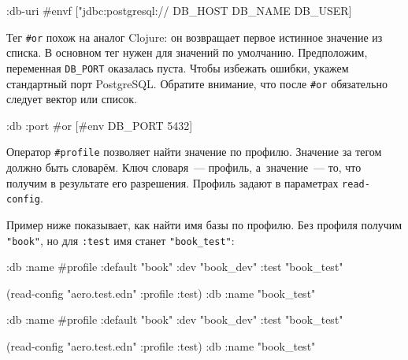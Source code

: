 \else

\begin{english}
  \begin{clojure}
{:db-uri #envf ["jdbc:postgresql://%
                DB_HOST DB_NAME DB_USER]}
  \end{clojure}
\end{english}

\fi

Тег \verb|#or| похож на аналог Clojure: он возвращает первое истинное значение
из списка. В основном тег нужен для значений по умолчанию. Предположим,
переменная \verb|DB_PORT| оказалась пуста. Чтобы избежать ошибки, укажем
стандартный порт PostgreSQL. Обратите внимание, что после \verb|#or| обязательно
следует вектор или список.

\begin{english}
  \begin{clojure}
{:db {:port #or [#env DB_PORT 5432]}}
  \end{clojure}
\end{english}


Оператор \verb|#profile| позволяет найти значение по профилю. Значение за тегом
должно быть словарём. Ключ словаря~--- профиль, а~значение~--- то, что получим в
результате его разрешения. Профиль задают в параметрах \verb|read-config|.

Пример ниже показывает, как найти имя базы по профилю. Без профиля получим
\verb|"book"|, но для \verb|:test| имя станет \verb|"book_test"|:

\ifx\DEVICETYPE\MOBILE

\begin{english}
  \begin{clojure}
{:db
 {:name
  #profile {:default "book"
            :dev     "book_dev"
            :test    "book_test"}}}

(read-config "aero.test.edn"
  {:profile :test})
{:db {:name "book_test"}}
  \end{clojure}
\end{english}

\else

\begin{english}
  \begin{clojure}
{:db {:name #profile {:default "book"
                      :dev     "book_dev"
                      :test    "book_test"}}}

(read-config "aero.test.edn" {:profile :test})
{:db {:name "book_test"}}
  \end{clojure}
\end{english}

